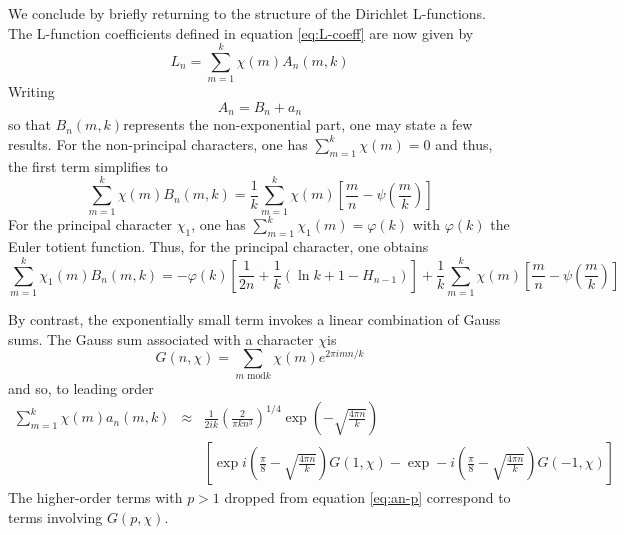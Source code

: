 \documentclass{amsart}
\begin{document}

We conclude by briefly returning to the structure of the Dirichlet
L-functions. The L-function coefficients defined in equation \ref{eq:L-coeff}
are now given by \begin{equation}
L_{n}=\sum_{m=1}^{k}\chi(m)A_{n}(m,k)\label{eq:}\end{equation}
 Writing \begin{equation}
A_{n}=B_{n}+a_{n}\label{eq:}\end{equation}
 so that $B_{n}(m,k)$represents the non-exponential part, one may
state a few results. For the non-principal characters, one has $\sum_{m=1}^{k}\chi(m)=0$
and thus, the first term simplifies to \begin{equation}
\sum_{m=1}^{k}\chi(m)B_{n}(m,k)=\frac{1}{k}\sum_{m=1}^{k}\chi(m)\left[\frac{m}{n}-\psi\left(\frac{m}{k}\right)\right]\label{eq:}\end{equation}
 For the principal character $\chi_{1}$, one has $\sum_{m=1}^{k}\chi_{1}(m)=\varphi(k)$
with $\varphi(k)$ the Euler totient function. Thus, for the principal
character, one obtains \begin{equation}
\sum_{m=1}^{k}\chi_{1}(m)B_{n}(m,k)=-\varphi(k)\left[\frac{1}{2n}+\frac{1}{k}\left(\ln k+1-H_{n-1}\right)\right]+\frac{1}{k}\sum_{m=1}^{k}\chi(m)\left[\frac{m}{n}-\psi\left(\frac{m}{k}\right)\right]\label{eq:}\end{equation}


By contrast, the exponentially small term invokes a linear combination
of Gauss sums. The Gauss sum associated with a character $\chi$is
\begin{equation}
G(n,\chi)=\sum_{m\mbox{ mod}k}\chi(m)e^{2\pi imn/k}\label{eq:}\end{equation}
 and so, to leading order \begin{eqnarray}
\sum_{m=1}^{k}\chi(m)a_{n}(m,k) & \approx & \frac{1}{2ik}\left(\frac{2}{\pi kn^{3}}\right)^{1/4}\exp\left(-\sqrt{\frac{4\pi n}{k}}\right)\nonumber \\
 &  & \left[\exp i\left(\frac{\pi}{8}-\sqrt{\frac{4\pi n}{k}}\right)G(1,\chi)-\exp-i\left(\frac{\pi}{8}-\sqrt{\frac{4\pi n}{k}}\right)G(-1,\chi)\right]\label{eq:}\end{eqnarray}
 The higher-order terms with $p>1$ dropped from equation \ref{eq:an-p}
correspond to terms involving $G(p,\chi)$. 
\end{document}
